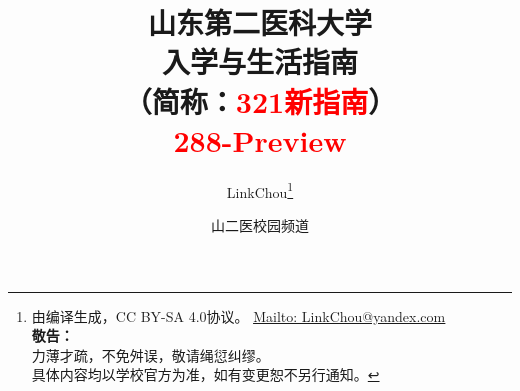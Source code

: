 

\title{%
\normalsize
{\Huge\textbf{山东第二医科大学\\[6pt]入学与生活指南}}\\[6pt]
（简称：\textcolor{red}{321新指南}）\\[25pt]
{\large\textcolor{red}{288-Preview}}\vspace*{-25pt}}
\author{LinkChou\thanks{由\LaTeXe 编译生成，CC BY-SA 4.0协议。%
        \uline{\href{Mailto:LinkChou@yandex.com}{Mailto: LinkChou@yandex.com}}\\%
        \textbf{敬告：}\\%
        \indent\indent 力薄才疏，不免舛误，敬请绳愆纠缪。\\%
        \indent\indent 具体内容均以学校官方为准，如有变更恕不另行通知。}\and 山二医校园频道}
\date{\DTMnow}
\maketitle

\renewcommand{\thefootnote}{\arabic{footnote}}

\tableofcontents